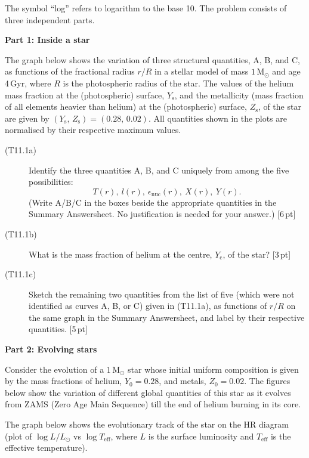 The symbol ``log'' refers to logarithm to the base 10. The problem consists of
three independent parts.

\medskip\noindent\textbf{Part 1: Inside a star}

The graph below shows the variation of three structural quantities, A, B, and
C, as functions of the fractional radius $r/R$ in a stellar model of mass
$1\,\mathrm{M_\odot}$ and age 4\,Gyr, where $R$ is the photospheric radius of
the star. The values of the helium mass fraction at the (photospheric) surface,
$Y_{\mathrm{s}}$, and the metallicity (mass fraction of all elements heavier
than helium) at the (photospheric) surface, $Z_{\mathrm{s}}$, of the star are
given by $(Y_{\mathrm{s}},\,Z_{\mathrm{s}}) = (0.28,\,0.02)$. All quantities
shown in the plots are normalised by their respective maximum values.

\begin{description}
\item[(T11.1a)] Identify the three quantities A, B, and C uniquely from among
  the five possibilities:
  \[ T(r),\ l(r),\ \epsilon_{\mathrm{nuc}}(r),\ X(r),\ Y(r). \]
  (Write A/B/C in the boxes beside the appropriate quantities in the Summary
  Answersheet. No justification is needed for your answer.) \hfill[6\,pt]
\item[(T11.1b)] What is the mass fraction of helium at the centre,
  $Y_{\mathrm{c}}$, of the star? \hfill[3\,pt]
\item[(T11.1c)] Sketch the remaining two quantities from the list of five
  (which were not identified as curves A, B, or C) given in (T11.1a), as
  functions of $r/R$ on the same graph in the Summary Answersheet, and label by
  their respective quantities. \hfill[5\,pt]
\end{description}

\medskip\noindent\textbf{Part 2: Evolving stars}

Consider the evolution of a $1\,\mathrm{M_\odot}$ star whose initial uniform
composition is given by the mass fractions of helium, $Y_0 = 0.28$, and metals,
$Z_0 = 0.02$. The figures below show the variation of different global
quantities of this star as it evolves from ZAMS (Zero Age Main Sequence) till
the end of helium burning in its core.

The graph below shows the evolutionary track of the star on the HR diagram
(plot of $\log L/L_\odot$ vs $\log T_{\mathrm{eff}}$, where $L$ is the surface
luminosity and $T_{\mathrm{eff}}$ is the effective temperature).

